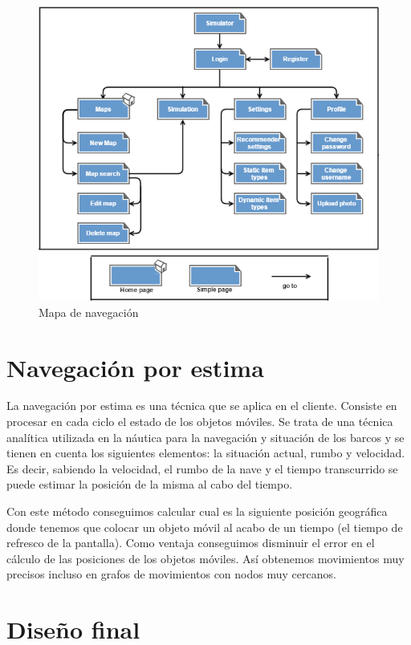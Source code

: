 \begin{figure}[H]
\centering\includegraphics[scale=0.7]{imagenes/mapa-navegacion.png}
\caption{Mapa de navegación}
\label{mapaNavegacion}
\end{figure}

\newpage

\section{Navegación por estima}

La navegación por estima es una técnica que se aplica en el cliente. Consiste en procesar en cada ciclo el estado de los objetos móviles. Se trata de una técnica analítica utilizada en la náutica para la navegación y situación de los barcos y se tienen en cuenta los siguientes elementos: la situación actual, rumbo y velocidad. Es decir, sabiendo la velocidad, el rumbo de la nave y el tiempo transcurrido se puede estimar la posición de la misma al cabo del tiempo. 

Con este método conseguimos calcular cual es la siguiente posición geográfica donde tenemos que colocar un objeto móvil al acabo de un tiempo (el tiempo de refresco de la pantalla). Como ventaja conseguimos disminuir el error en el cálculo de las posiciones de los objetos móviles. Así obtenemos movimientos muy precisos incluso en grafos de movimientos con nodos muy cercanos.

\section{Diseño final}

